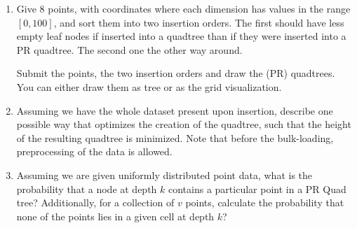 
\begin{enumerate}
\item Give 8 points, with coordinates where each dimension has values in the range $[0,100]$, and sort them into two insertion orders.
The first should have less empty leaf nodes if inserted into a quadtree than if they were inserted into a PR quadtree.
The second one the other way around.

Submit the points, the two insertion orders and draw the (PR) quadtrees. You can either draw them as tree or as the grid visualization.

\item
Assuming we have the whole dataset present upon insertion, describe one possible way that optimizes the creation of the quadtree, such that the height of the resulting quadtree is minimized.
Note that before the bulk-loading, preprocessing of the data is allowed.

\item
  Assuming we are given uniformly distributed point data, what is the probability that a node at depth $k$ contains a particular point in a PR Quad tree? 
  Additionally, for a collection of $v$ points, calculate the probability that none of the points lies in a given cell at depth $k$? 

\end{enumerate}

\newpage
{}

